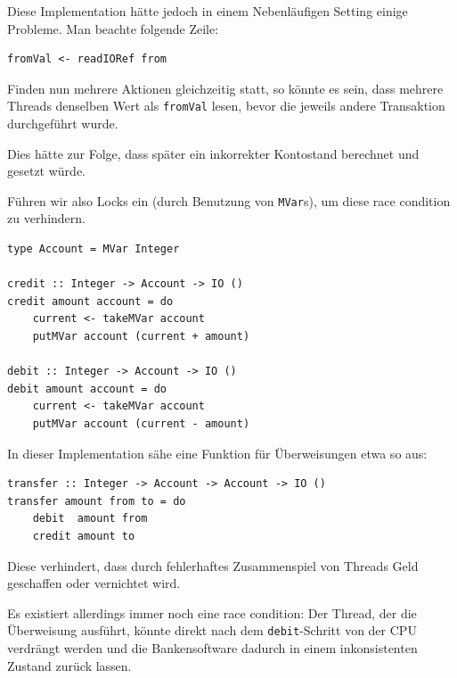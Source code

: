 \documentclass{beamer}
\begin{document}
\begin{frame}[fragile]

Diese Implementation hätte jedoch in einem Nebenläufigen Setting einige Probleme. Man beachte folgende Zeile:

\begin{verbatim}
fromVal <- readIORef from
\end{verbatim}
\pause

Finden nun mehrere Aktionen gleichzeitig statt, so könnte es sein, dass mehrere Threads denselben Wert als \texttt{fromVal} lesen, bevor die jeweils andere Transaktion durchgeführt wurde.

Dies hätte zur Folge, dass später ein inkorrekter Kontostand berechnet und gesetzt würde.

\end{frame}


\begin{frame}[fragile]

Führen wir also Locks ein (durch Benutzung von \texttt{MVar}s), um diese race condition zu verhindern. \pause\smallskip

\begin{verbatim}
type Account = MVar Integer
 
credit :: Integer -> Account -> IO ()
credit amount account = do
    current <- takeMVar account
    putMVar account (current + amount)
 
debit :: Integer -> Account -> IO ()
debit amount account = do
    current <- takeMVar account
    putMVar account (current - amount)

\end{verbatim}

\end{frame}


\begin{frame}[fragile]

In dieser Implementation sähe eine Funktion für Überweisungen etwa so aus:

\begin{verbatim}
transfer :: Integer -> Account -> Account -> IO ()
transfer amount from to = do
    debit  amount from
    credit amount to
\end{verbatim}
\pause

Diese verhindert, dass durch fehlerhaftes Zusammenspiel von Threads Geld geschaffen oder
vernichtet wird.\pause\smallskip\smallskip

Es existiert allerdings immer noch eine race condition: Der Thread, der die Überweisung ausführt, könnte direkt nach dem \texttt{debit}-Schritt von der CPU verdrängt werden und die Bankensoftware dadurch in einem inkonsistenten Zustand zurück lassen.

\end{frame}
\end{document}
